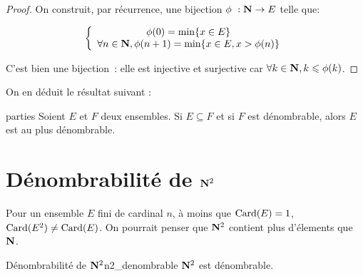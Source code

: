 \documentclass[a4paper,french,final]{memoir}
\begin{document}
\begin{proof}
	On construit, par récurrence, une bijection $\phi~: \NN \to E$ telle que:

	\[\left\lbrace \begin{array}{c}
	\phi(0) = \min \{x \in E\} \\
	\forall n \in \NN, \phi(n+1) = \min \{x \in E, x > \phi(n) \}
	\end{array} \right.\]

	C'est bien une bijection~: elle est injective et surjective car $\forall k \in \NN, k \leq \phi(k)$.
\end{proof}
On en déduit le résultat suivant :
\begin{theoremb}{}{parties}
	Soient $E$ et $F$ deux ensembles.
	Si $E \subseteq F$ et si $F$ est dénombrable, alors $E$ est au plus dénombrable.
\end{theoremb}
\section{\texorpdfstring{Dénombrabilité de $\mathbf{N}^2$}{Dénombrabilité de N²}}
Pour un ensemble $E$ fini de cardinal $n$, à moins que $\operatorname{Card}(E) = 1$, $\operatorname{Card}(E^2) \neq \operatorname{Card}(E)$. On pourrait penser que $\mathbf{N}^2 $ contient plus d'élements que $\mathbf{N}$.

\begin{theoremb}{Dénombrabilité de $\mathbf{N}^2$}{n2_denombrable}
	$\mathbf{N}^2$ est dénombrable.
\end{theoremb}
\end{document}
